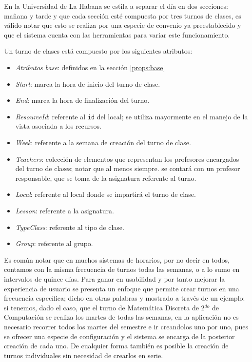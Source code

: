 En la Universidad de La Habana se estila a separar el día en dos secciones: mañana y tarde y que cada sección esté compuesta por tres turnos de clases, es válido notar que esto se realiza por una especie de convenio ya preestablecido y que el sistema cuenta con las herramientas para variar este funcionamiento. 

Un turno de clases está compuesto por los siguientes atributos:
\begin{itemize}
	\item \textit{Atributos base}: definidos en la sección \ref{props:base}
	\item \textit{Start}: marca la hora de inicio del turno de clase.
	\item \textit{End}: marca la hora de finalización del turno.
	\item \textit{ResourceId}: referente al \texttt{id} del local; se utiliza mayormente en el manejo de la vista asociada a los recursos.
	\item \textit{Week}: referente a la semana de creación del turno de clase.
	\item \textit{Teachers}: colección de elementos que representan los profesores encargados del turno de clases; notar que al menos siempre. se contará con un profesor responsable, que se toma de la asignatura referente al turno.\item \textit{Local}: referente al local donde se impartirá el turno de clase.
	\item \textit{Lesson}: referente a la asignatura.
	\item \textit{TypeClass}: referente al tipo de clase.
	\item \textit{Group}: referente al grupo.
\end{itemize}

Es común notar que en muchos sistemas de horarios, por no decir en todos, contamos con la misma frecuencia de turnos todas las semanas, o a lo sumo en intervalos de quince días. Para ganar en usabilidad y por tanto mejorar la experiencia de usuario se presenta un enfoque que permite crear turnos en una frecuencia específica; dicho en otras palabras y mostrado a través de un ejemplo: si tenemos, dado el caso, que el turno de Matemática Discreta de 2$^{do}$ de Computación se realiza los martes de todas las semanas, en la aplicación no es necesario recorrer todos los martes del semestre e ir creandolos uno por uno, pues se ofrecer una especie de configuración y el sistema se encarga de la posterior creación de cada uno. De cualquier forma también  es posible la creación de turnos individuales sin necesidad de crearlos en serie.

